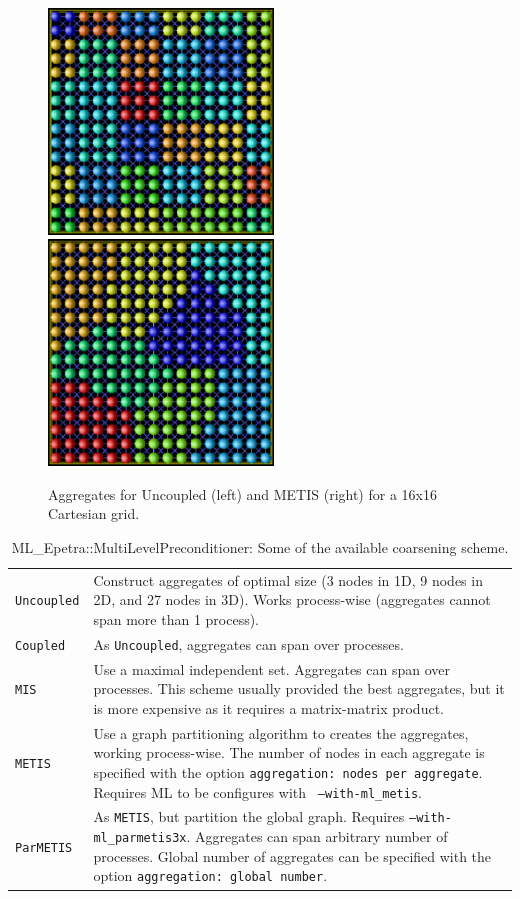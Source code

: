 \begin{figure}[htbp]
  \centering
  \includegraphics[height=6cm]{ml_Uncoupled-16x16.ps} \hspace{0.5cm}
  \includegraphics[height=6cm]{ml_METIS-16x16.ps}
  \caption{Aggregates for Uncoupled (left) and METIS (right) for a 16x16 Cartesian grid.}
  \label{fig:ml:comparison}
\end{figure}

\begin{table}
\begin{center}
\begin{tabular}{ | p{5cm} | p{10cm} | }
\hline
\verb!Uncoupled! & Construct
aggregates of optimal size (3 nodes in 1D, 9 nodes in 2D, and 27 nodes
in 3D). Works process-wise (aggregates cannot span more than 1
process). \\
\verb!Coupled! & As \verb!Uncoupled!, aggregates can span over
processes. \\
\verb!MIS! & Use a maximal independent set. Aggregates can span over
processes. This scheme usually provided the best aggregates, but it is
more expensive as it requires a matrix-matrix product. \\
\verb!METIS! & Use a graph partitioning algorithm to creates the
aggregates, working process-wise. The number of nodes in each aggregate
is specified with the option {\tt aggregation: nodes per
  aggregate}. Requires ML to be configures with {\tt
  --with-ml\_metis}. \\
\verb!ParMETIS! & As \verb!METIS!, but partition the global
graph. Requires {\tt --with-ml\_parmetis3x}. Aggregates can span
arbitrary number of processes. Global number of aggregates can be
specified with the option {\tt aggregation: global number}. \\
\hline
\end{tabular}
\caption{ML\_Epetra::MultiLevelPreconditioner: Some of the available coarsening scheme.}
\label{tab:ml:aggr}
\end{center}
\end{table}

